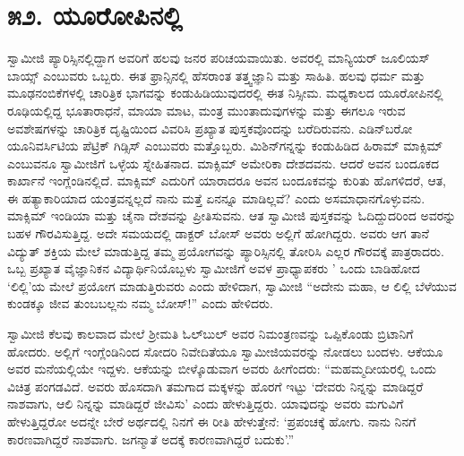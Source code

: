 
\chapter*{೫೨. ಯೂರೋಪಿನಲ್ಲಿ}

 ಸ್ವಾಮೀಜಿ ಪ್ಯಾರಿಸ್ಸಿನಲ್ಲಿದ್ದಾಗ ಅವರಿಗೆ ಹಲವು ಜನರ ಪರಿಚಯವಾಯಿತು. ಅವರಲ್ಲಿ ಮಾನ್ಯಿಯರ್ ಜೂಲಿಯಸ್ ಬಾಯ್ಸ್ ಎಂಬುವರು ಒಬ್ಬರು. ಈತ ಫ್ರಾನ್ಸಿನಲ್ಲಿ ಹೆಸರಾಂತ ತತ್ತ್ವಜ್ಞಾನಿ ಮತ್ತು ಸಾಹಿತಿ. ಹಲವು ಧರ್ಮ ಮತ್ತು ಮೂಢನಂಬಿಕೆಗಳಲ್ಲಿ ಚಾರಿತ್ರಿಕ ಭಾಗವನ್ನು ಕಂಡುಹಿಡಿಯುವುದರಲ್ಲಿ ಈತ ನಿಸ್ಸೀಮ. ಮಧ್ಯಕಾಲದ ಯೂರೋಪಿನಲ್ಲಿ ರೂಢಿಯಲ್ಲಿದ್ದ ಭೂತಾರಾಧನೆ, ಮಾಯಾ ಮಾಟ, ಮಂತ್ರ ಮುಂತಾದುವುಗಳನ್ನು ಮತ್ತು ಈಗಲೂ ಇರುವ ಅವಶೇಷಗಳನ್ನು ಚಾರಿತ್ರಿಕ ದೃಷ್ಟಿಯಿಂದ ವಿವರಿಸಿ ಪ್ರಖ್ಯಾತ ಪುಸ್ತಕವೊಂದನ್ನು ಬರೆದಿರುವನು. ಎಡಿನ್‍ಬರೋ ಯೂನಿವರ್ಸಿಟಿಯ ಪೆಟ್ರಿಕ್ ಗಿಡ್ಸಿಸ್ ಎಂಬುವರು ಮತ್ತೊಬ್ಬರು. ಮಿಶಿನ್‍ಗನ್ನನ್ನು ಕಂಡುಹಿಡಿದ ಹಿರಾಮ್ ಮಾಕ್ಸಿಮ್ ಎಂಬುವನೂ ಸ್ವಾಮೀಜಿಗೆ ಒಳ್ಳೆಯ ಸ್ನೇಹಿತನಾದ. ಮಾಕ್ಸಿಮ್ ಅಮೇರಿಕಾ ದೇಶದವನು. ಆದರೆ ಅವನ ಬಂದೂಕದ ಕಾರ್ಖಾನೆ ಇಂಗ್ಲೆಂಡಿನಲ್ಲಿದೆ. ಮಾಕ್ಸಿಮ್ ಎದುರಿಗೆ ಯಾರಾದರೂ ಅವನ ಬಂದೂಕವನ್ನು ಕುರಿತು ಹೊಗಳಿದರೆ, ಆತ, ಈ ಹತ್ಯಾಕಾರಿಯಾದ ಯಂತ್ರವನ್ನಲ್ಲದೆ ನಾನು ಮತ್ತೆ ಏನನ್ನೂ ಮಾಡಿಲ್ಲವೆ? ಎಂದು ಅಸಮಾಧಾನಗೊಳ್ಳುವನು. ಮಾಕ್ಸಿಮ್ ಇಂಡಿಯಾ ಮತ್ತು ಚೈನಾ ದೇಶವನ್ನು ಪ್ರೀತಿಸುವನು. ಆತ ಸ್ವಾಮೀಜಿ ಪುಸ್ತಕವನ್ನು ಓದಿದ್ದುದರಿಂದ ಅವರನ್ನು ಬಹಳ ಗೌರವಿಸುತ್ತಿದ್ದ. ಅದೇ ಸಮಯದಲ್ಲಿ ಡಾಕ್ಟರ್ ಬೋಸ್ ಅವರು ಅಲ್ಲಿಗೆ ಹೋಗಿದ್ದರು. ಅವರು ಆಗ ತಾನೆ ವಿದ್ಯುತ್ ಶಕ್ತಿಯ ಮೇಲೆ ಮಾಡುತ್ತಿದ್ದ ತಮ್ಮ ಪ್ರಯೋಗವನ್ನು ಪ್ಯಾರಿಸ್ಸಿನಲ್ಲಿ ತೋರಿಸಿ ಎಲ್ಲರ ಗೌರವಕ್ಕೆ ಪಾತ್ರರಾದರು. ಒಬ್ಬ ಪ್ರಖ್ಯಾತ ವೈಜ್ಞಾನಿಕನ ವಿದ್ಯಾರ್ಥಿನಿಯೊಬ್ಬಳು ಸ್ವಾಮೀಜಿಗೆ ಅವಳ ಪ್ರಾಧ್ಯಾಪಕರು ' ಒಂದು ಬಾಡಿಹೋದ ‘ಲಿಲ್ಲಿ’ಯ ಮೇಲೆ ಪ್ರಯೋಗ ಮಾಡುತ್ತಿರುವರು ಎಂದು ಹೇಳಿದಾಗ, ಸ್ವಾಮೀಜಿ “ಅದೇನು ಮಹಾ, ಆ ಲಿಲ್ಲಿ ಬೆಳೆಯುವ ಕುಂಡಕ್ಕೂ ಜೀವ ತುಂಬಬಲ್ಲನು ನಮ್ಮ ಬೋಸ್!” ಎಂದು ಹೇಳಿದರು.

 ಸ್ವಾಮೀಜಿ ಕೆಲವು ಕಾಲವಾದ ಮೇಲೆ ಶ‍್ರೀಮತಿ ಓಲ್‍ಬುಲ್ ಅವರ ನಿಮಂತ್ರಣವನ್ನು ಒಪ್ಪಿಕೊಂಡು ಬ್ರಿಟಾನಿಗೆ ಹೋದರು. ಅಲ್ಲಿಗೆ ಇಂಗ್ಲೆಂಡಿನಿಂದ ಸೋದರಿ ನಿವೇದಿತೆಯೂ ಸ್ವಾಮೀಜಿಯವರನ್ನು ನೋಡಲು ಬಂದಳು. ಆಕೆಯೂ ಅವರ ಮನೆಯಲ್ಲಿಯೇ ಇದ್ದಳು. ಆಕೆಯನ್ನು ಬೀಳ್ಕೊಡುವಾಗ ಅವರು ಹೀಗೆಂದರು: “ಮಹಮ್ಮದೀಯರಲ್ಲಿ ಒಂದು ವಿಚಿತ್ರ ಪಂಗಡವಿದೆ. ಅವರು ಹೊಸದಾಗಿ ತಮಗಾದ ಮಕ್ಕಳನ್ನು ಹೊರಗೆ ಇಟ್ಟು ‘ದೇವರು ನಿನ್ನನ್ನು ಮಾಡಿದ್ದರೆ ನಾಶವಾಗು, ಆಲಿ ನಿನ್ನನ್ನು ಮಾಡಿದ್ದರೆ ಜೀವಿಸು’ ಎಂದು ಹೇಳುತ್ತಿದ್ದರು. ಯಾವುದನ್ನು ಅವರು ಮಗುವಿಗೆ ಹೇಳುತ್ತಿದ್ದರೋ ಅದನ್ನೇ ಬೇರೆ ಅರ್ಥದಲ್ಲಿ ನಿನಗೆ ಈ ರೀತಿ ಹೇಳುತ್ತೇನೆ: ‘ಪ್ರಪಂಚಕ್ಕೆ ಹೋಗು. ನಾನು ನಿನಗೆ ಕಾರಣವಾಗಿದ್ದರೆ ನಾಶವಾಗು. ಜಗನ್ಮಾತೆ ಅದಕ್ಕೆ ಕಾರಣವಾಗಿದ್ದರೆ ಬದುಕು’.” 

